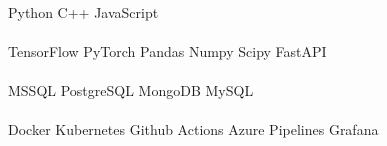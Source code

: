 \begin{minipage}[t]{.6\textwidth}
    \\
    Python \textbullet{}   C++ \textbullet{} JavaScript
    \\
    \\
    TensorFlow \textbullet{} PyTorch \textbullet{} Pandas \textbullet{} Numpy \textbullet{} Scipy \textbullet{} FastAPI
    \\
     \\
    MSSQL \textbullet{} PostgreSQL \textbullet{} MongoDB \textbullet{} MySQL
    \\
    \\
    Docker \textbullet{} Kubernetes \textbullet{} Github Actions \textbullet{} Azure Pipelines \textbullet{} Grafana
    \sectionsep
    \end{minipage}